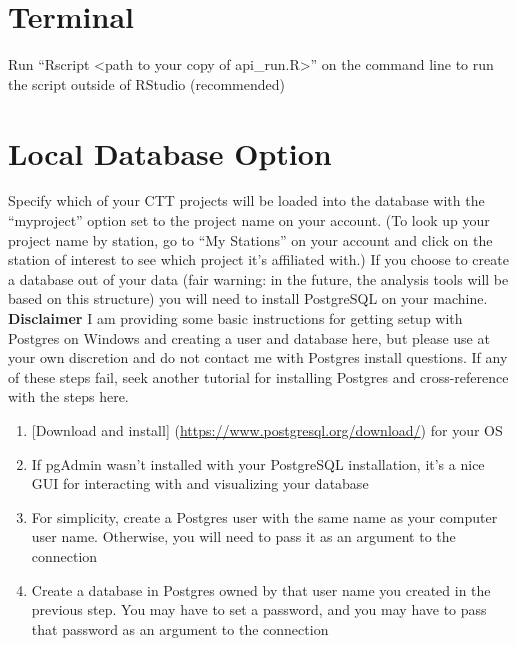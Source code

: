 \documentclass[
]{book}
\providecommand{\tightlist}{%
  \setlength{\itemsep}{0pt}\setlength{\parskip}{0pt}}
\begin{document}
\section{Terminal}\label{terminal}

Run ``Rscript \textless path to your copy of api\_run.R\textgreater{}'' on the command line to run the script outside of RStudio (recommended)

\section{Local Database Option}\label{local-database-option}

Specify which of your CTT projects will be loaded into the database with the ``myproject'' option set to the project name on your account. (To look up your project name by station, go to ``My Stations'' on your account and click on the station of interest to see which project it's affiliated with.) If you choose to create a database out of your data (fair warning: in the future, the analysis tools will be based on this structure) you will need to install PostgreSQL on your machine.\\
\textbf{Disclaimer} I am providing some basic instructions for getting setup with Postgres on Windows and creating a user and database here, but please use at your own discretion and do not contact me with Postgres install questions. If any of these steps fail, seek another tutorial for installing Postgres and cross-reference with the steps here.

\begin{enumerate}
\def\labelenumi{\arabic{enumi}.}
\tightlist
\item
  {[}Download and install{]} (\url{https://www.postgresql.org/download/}) for your OS\\
\item
  If pgAdmin wasn't installed with your PostgreSQL installation, it's a nice GUI for interacting with and visualizing your database
\item
  For simplicity, create a Postgres user with the same name as your computer user name. Otherwise, you will need to pass it as an argument to the connection\\
\item
  Create a database in Postgres owned by that user name you created in the previous step. You may have to set a password, and you may have to pass that password as an argument to the connection
\end{enumerate}
\end{document}
